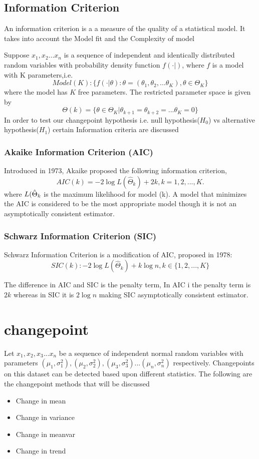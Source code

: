 \documentclass{article}
\begin{document}
\subsection{Information Criterion}
An information criterion is a a measure of the quality of a statistical model. It takes into account the Model fit and the Complexity of model

Suppose $x_{1},x_{2}...x_{n}$ is a sequence of independent and identically distributed random variables with probability density function $f(\cdot|)$, where $f$ is a model with K parameters,i.e.
$$Model(K) : \{f(\cdot|\theta): \theta = (\theta_{1},\theta_{2},...\theta_{K}),\theta \in \Theta_{K} \}$$ where the model has $K$ free parameters. The restricted parameter space is given by 
$$\Theta(k) = \{ \theta \in \Theta_{K} | \theta_{k+1} = \theta_{k+2} = ... \theta_{K} = 0\}$$
In order to test our changepoint hypothesis i.e. null hypothesis($H_{0}$) vs alternative hypothesis($H_{1}$) certain Information criteria are discussed 
\subsubsection{Akaike Information Criterion (AIC)}
Introduced in 1973, Akaike proposed the following information criterion,
$$AIC(k) = -2\log L(\hat{\Theta}_{k}) + 2k, k=1,2,...,K.$$
where $L(\Hat{\Theta}_{k}$ is the maximum likelihood for model (k). A model that minimizes the AIC is considered to be the most appropriate model though it is not an asymptotically consistent estimator.
\subsubsection{Schwarz Information Criterion (SIC)}
Schwarz Information Criterion is a modification of AIC, proposed in 1978:
$$SIC(k) : -2\log L(\hat{\Theta}_{k}) + k \log n, k \in \{1,2,...,K\} $$

The difference in AIC and SIC is the penalty term, In AIC i the penalty term is $2k$ whereas in SIC it is $2\log n$ making SIC asymptotically consistent estimator.
\clearpage
\section{changepoint}
Let $x_{1},x_{2},x_{3}...x_{n}$ be a sequence of independent normal random variables with parameters $(\mu_{1},\sigma^{2}_{1}),(\mu_{2},\sigma^{2}_{2}),(\mu_{3},\sigma^{2}_{3})...(\mu_{n},\sigma^{2}_{n})$ respectively.
Changepoints on this dataset can be detected based upon different statistics. The following are the changepoint methods that will be discussed 
\begin{itemize}
    \item Change in mean
    \item Change in variance
    \item Change in meanvar
    \item Change in trend
\end{itemize}
\end{document}
